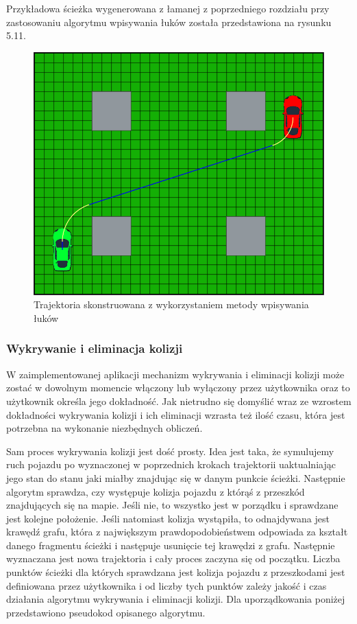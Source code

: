 \documentclass[a4paper,11pt,twoside]{report}
\theoremstyle{definition}
\begin{document}
Przykładowa ścieżka wygenerowana z łamanej z poprzedniego rozdziału przy zastosowaniu algorytmu wpisywania łuków została przedstawiona na rysunku 5.11.

\begin{figure}[h!]
\centering
\includegraphics[scale=0.4]{finalPathArcs}
\caption[Trajektoria skonstruowana z wykorzystaniem metody wpisywania łuków]{Trajektoria skonstruowana z wykorzystaniem metody wpisywania łuków}
\end{figure}

\subsubsection{Wykrywanie i eliminacja kolizji}

W zaimplementowanej aplikacji mechanizm wykrywania i eliminacji kolizji może zostać w dowolnym momencie włączony lub wyłączony przez użytkownika oraz to użytkownik określa jego dokładność. Jak nietrudno się domyślić wraz ze wzrostem dokładności wykrywania kolizji i ich eliminacji wzrasta też ilość czasu, która jest potrzebna na wykonanie niezbędnych obliczeń. 

Sam proces wykrywania kolizji jest dość prosty. Idea jest taka, że symulujemy ruch pojazdu po wyznaczonej w poprzednich krokach trajektorii uaktualniając jego stan do stanu jaki miałby znajdując się w danym punkcie ścieżki. Następnie algorytm sprawdza, czy występuje kolizja pojazdu z którąś z przeszkód znajdujących się na mapie. Jeśli nie, to wszystko jest w porządku i sprawdzane jest kolejne położenie. Jeśli natomiast kolizja wystąpiła, to odnajdywana jest krawędź grafu, która z największym prawdopodobieństwem odpowiada za kształt danego fragmentu ścieżki i następuje usunięcie tej krawędzi z grafu. Następnie wyznaczana jest nowa trajektoria i cały proces zaczyna się od początku. Liczba punktów ścieżki dla których sprawdzana jest kolizja pojazdu z przeszkodami jest definiowana przez użytkownika i od liczby tych punktów zależy jakość i czas działania algorytmu wykrywania i eliminacji kolizji. Dla uporządkowania poniżej przedstawiono pseudokod opisanego algorytmu.
\end{document}
